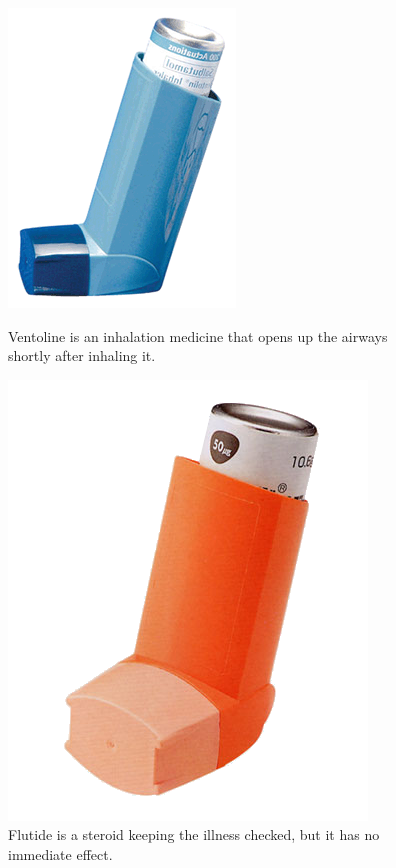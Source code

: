 \begin{figure}
	\begin{minipage}[b]{0.4\linewidth}
		\centering
			\includegraphics[width=0.15\paperwidth]{Pictures/ventoline}
		\caption[Ventoline]{Ventoline\cite{ventoline} is an inhalation medicine that opens up the airways shortly after inhaling it.}
		\label{fig:ventoline}
	\end{minipage}
	\hspace{3cm}
	\begin{minipage}[b]{0.4\linewidth}
		\centering
			\includegraphics[width=0.15\paperwidth]{Pictures/flutide}
		\caption[Flutide]{Flutide is a steroid keeping the illness checked, but it has no immediate effect.}
		\label{fig:flutide}
	\end{minipage}
\end{figure}

